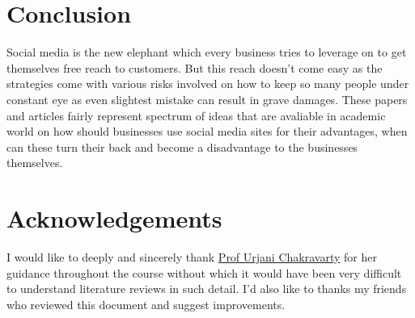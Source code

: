 \documentclass[12pt]{article}
\begin{document}
\section{Conclusion}
Social media is the new elephant which every business tries to leverage on to get themselves free reach to customers. But this reach doesn't come easy as the strategies come with various risks involved on how to keep so many people under constant eye as even slightest mistake can result in grave damages. These papers and articles fairly represent spectrum of ideas that are avaliable in academic world on how should businesses use social media sites for their advantages, when can these turn their back and become a disadvantage to the businesses themselves.

\section*{Acknowledgements}
I would like to deeply and sincerely thank \href{https://www.iimidr.ac.in/faculty/full-time-faculty/profile/?id=92}{Prof Urjani Chakravarty} for her guidance throughout the course without which it would have been very difficult to understand literature reviews in such detail. I'd also like to thanks my friends who reviewed this document and suggest improvements.


\newpage


\end{document}
